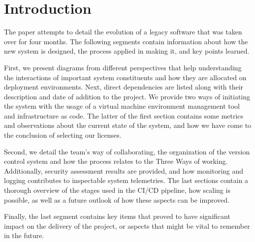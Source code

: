 \section{Introduction}

The paper attempts to detail the evolution of a legacy software that was taken over for four months. The following segments contain information about how the new system is designed, the process applied in making it, and key points learned.

First, we present diagrams from different perspectives that help understanding the interactions of important system constituents and how they are allocated on deployment environments. Next, direct dependencies are listed along with their description and date of addition to the project. We provide two ways of initiating the system with the usage of a virtual machine environment management tool and infrastructure as code. The latter of the first section contains some metrics and observations about the current state of the system, and how we have come to the conclusion of selecting our licenses.

Second, we detail the team's way of collaborating, the organization of the version control system and how the process relates to the Three Ways of working. Additionally, security assessment results are provided, and how monitoring and logging contributes to inspectable system telemetries. The last sections contain a thorough overview of the stages used in the CI/CD pipeline, how scaling is possible, as well as a future outlook of how these aspects can be improved.

Finally, the last segment contains key items that proved to have significant impact on the delivery of the project, or aspects that might be vital to remember in the future.